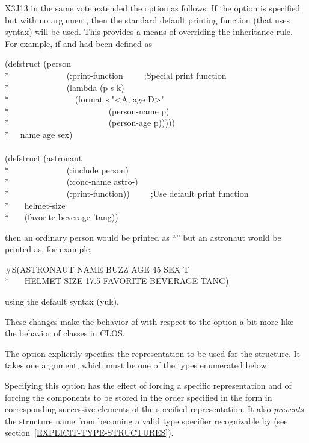 \begin{flushdesc}
\begin{new}
X3J13 in the same vote extended the  option
as follows: If the  option is specified but with
no argument, then the standard default printing function (that uses
 syntax) will be used.  This provides a means of overriding the
inheritance rule.  For example, if  and 
had been defined as
\begin{lisp}
(defstruct (person \\*
~~~~~~~~~~~~~(:print-function~~~~~;{\rm Special print function}\\*
~~~~~~~~~~~~~(lambda (p s k) \\*
~~~~~~~~~~~~~~~(format s "<{\Xtilde}A, age {\Xtilde}D>" \\*
~~~~~~~~~~~~~~~~~~~~~~~(person-name p) \\*
~~~~~~~~~~~~~~~~~~~~~~~(person-age p))))) \\*
~~name age sex) \\
\\
(defstruct (astronaut \\*
~~~~~~~~~~~~~(:include person) \\*
~~~~~~~~~~~~~(:conc-name astro-) \\*
~~~~~~~~~~~~~(:print-function))~~~~~;{\rm Use default print function} \\*
~~~helmet-size \\*
~~~(favorite-beverage 'tang))
\end{lisp}
then an ordinary person would be printed as ``''
but an astronaut would be printed as, for example,
\begin{lisp}
\#S(ASTRONAUT NAME BUZZ AGE 45 SEX T \\*
~~~HELMET-SIZE 17.5 FAVORITE-BEVERAGE TANG)
\end{lisp}
using the default  syntax (yuk).

These changes make the behavior of  with respect to the
 option a bit more like the behavior of classes in CLOS.
\end{new}

\item[\cd{:type}]
The  option explicitly specifies the representation to be used for
the structure.  It takes one argument, which must
be one of the types enumerated below.

Specifying this option has the effect of forcing
a specific representation and of forcing the components to be
stored in the order specified in the  form
in corresponding successive elements of the specified representation.
It also {\it prevents} the structure name from becoming a valid
type specifier recognizable by 
(see section~\ref{EXPLICIT-TYPE-STRUCTURES}).


\end{flushdesc}
